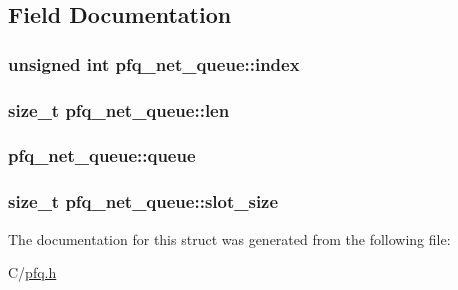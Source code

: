 \subsection{Field Documentation}
\hypertarget{structpfq__net__queue_af66bc8d91f38d0d6c218c9bae8081185}{
\subsubsection[{index}]{\setlength{\rightskip}{0pt plus 5cm}unsigned int pfq\-\_\-net\-\_\-queue\-::index}}\label{structpfq__net__queue_af66bc8d91f38d0d6c218c9bae8081185}
\hypertarget{structpfq__net__queue_a4b511d3c1dbd8d9ed36008500bd44350}{
\subsubsection[{len}]{\setlength{\rightskip}{0pt plus 5cm}size\-\_\-t pfq\-\_\-net\-\_\-queue\-::len}}\label{structpfq__net__queue_a4b511d3c1dbd8d9ed36008500bd44350}
\hypertarget{structpfq__net__queue_a4858e72d7edbe741638986afc0ba9282}{
\subsubsection[{queue}]{ pfq\-\_\-net\-\_\-queue\-::queue}}\label{structpfq__net__queue_a4858e72d7edbe741638986afc0ba9282}
\hypertarget{structpfq__net__queue_ad15e389ac5a91523cccb571c094d3f4e}{
\subsubsection[{slot\-\_\-size}]{\setlength{\rightskip}{0pt plus 5cm}size\-\_\-t pfq\-\_\-net\-\_\-queue\-::slot\-\_\-size}}\label{structpfq__net__queue_ad15e389ac5a91523cccb571c094d3f4e}


The documentation for this struct was generated from the following file\-:\begin{DoxyCompactItemize}
\item 
C/\hyperlink{pfq_8h}{pfq.\-h}\end{DoxyCompactItemize}
